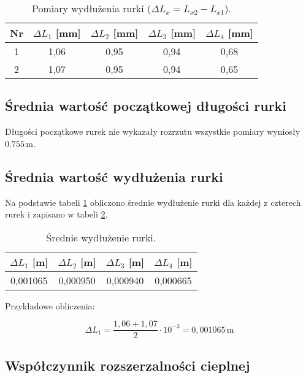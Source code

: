 \documentclass[a4paper,12pt]{article}
\begin{document}
\begin{table}[H]
    \centering
    \begin{tabular}{|c|c|c|c|c|}
        \hline
        Nr & $\Delta L_1$ [mm] & $\Delta L_2$ [mm] & $\Delta L_3$ [mm] & $\Delta L_4$ [mm] \\
        \hline
        1 & 1,06 & 0,95 & 0,94 & 0,68 \\
        2 & 1,07 & 0,95 & 0,94 & 0,65 \\
        \hline
    \end{tabular}
    \caption{Pomiary wydłużenia rurki ($\Delta L_x = L_{x2} - L_{x1}$).}
    \label{tab:pomiary_wydluzenia}
\end{table}



\subsection{Średnia wartość początkowej długości rurki}

Długości początkowe rurek nie wykazały rozrzutu wszystkie pomiary wyniosły $0.755\,\text{m}$.

\subsection{Średnia wartość wydłużenia rurki}

Na podstawie tabeli \ref{tab:pomiary_wydluzenia} obliczono średnie wydłużenie rurki dla każdej z czterech rurek i zapisano w tabeli \ref{tab:srednie_wydluzenie}.

\begin{table}[H]
    \centering
    \begin{tabular}{|c|c|c|c|}
        \hline
        $\Delta L_1$ [m] & $\Delta L_2$ [m] & $\Delta L_3$ [m] & $\Delta L_4$ [m] \\
        \hline
        0,001065 & 0,000950 & 0,000940 & 0,000665 \\
        \hline
    \end{tabular}
    \caption{Średnie wydłużenie rurki.}
    \label{tab:srednie_wydluzenie}
\end{table}

Przykładowe obliczenia:

\begin{equation*}
    \Delta L_1 = \frac{1,06 + 1,07}{2} \cdot 10^{-3} = 0,001065\,\text{m}
\end{equation*}

\subsection{Współczynnik rozszerzalności cieplnej}
\end{document}
